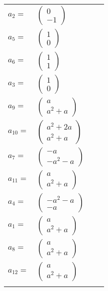 \documentclass[1p]{elsarticle_modified}
\theoremstyle{definition}
\begin{document}
\begin{tabular}{m{7pt} m{180pt} m{7pt} m{180pt} }
\flushright $a_{2}=$&$\begin{pmatrix}0\\-1\end{pmatrix}$ \\
\flushright $a_{5}=$&$\begin{pmatrix}1\\0\end{pmatrix}$ \\
\flushright $a_{6}=$&$\begin{pmatrix}1\\1\end{pmatrix}$ \\
\flushright $a_{3}=$&$\begin{pmatrix}1\\0\end{pmatrix}$ \\
\flushright $a_{9}=$&$\begin{pmatrix}a\\a^2+a\end{pmatrix}$ \\
\flushright $a_{10}=$&$\begin{pmatrix}a^2+2 a\\a^2+a\end{pmatrix}$ \\
\flushright $a_{7}=$&$\begin{pmatrix}- a\\- a^2- a\end{pmatrix}$ \\
\flushright $a_{11}=$&$\begin{pmatrix}a\\a^2+a\end{pmatrix}$ \\
\flushright $a_{4}=$&$\begin{pmatrix}- a^2- a\\- a\end{pmatrix}$ \\
\flushright $a_{1}=$&$\begin{pmatrix}a\\a^2+a\end{pmatrix}$ \\
\flushright $a_{8}=$&$\begin{pmatrix}a\\a^2+a\end{pmatrix}$ \\
\flushright $a_{12}=$&$\begin{pmatrix}a\\a^2+a\end{pmatrix}$\\&\end{tabular}
\end{document}
